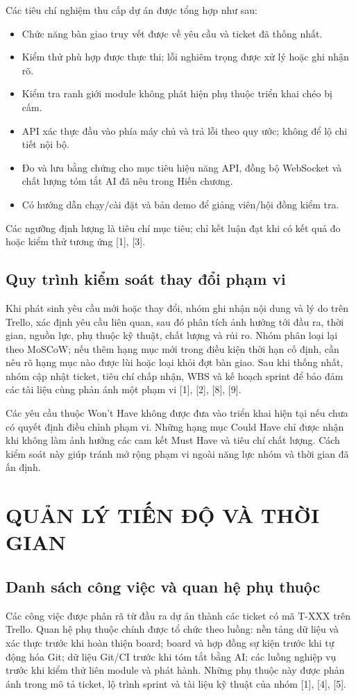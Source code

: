 \documentclass[12pt,a4paper]{report}
\begin{document}
Các tiêu chí nghiệm thu cấp dự án được tổng hợp như sau:
\begin{itemize}
    \item Chức năng bàn giao truy vết được về yêu cầu và ticket đã thống nhất.
    \item Kiểm thử phù hợp được thực thi; lỗi nghiêm trọng được xử lý hoặc ghi nhận rõ.
    \item Kiểm tra ranh giới module không phát hiện phụ thuộc triển khai chéo bị cấm.
    \item API xác thực đầu vào phía máy chủ và trả lỗi theo quy ước; không để lộ chi tiết nội bộ.
    \item Đo và lưu bằng chứng cho mục tiêu hiệu năng API, đồng bộ WebSocket và chất lượng tóm tắt AI đã nêu trong Hiến chương.
    \item Có hướng dẫn chạy/cài đặt và bản demo để giảng viên/hội đồng kiểm tra.
\end{itemize}
Các ngưỡng định lượng là tiêu chí mục tiêu; chỉ kết luận đạt khi có kết quả đo hoặc kiểm thử tương ứng [1], [3].

\section{Quy trình kiểm soát thay đổi phạm vi}
Khi phát sinh yêu cầu mới hoặc thay đổi, nhóm ghi nhận nội dung và lý do trên Trello, xác định yêu cầu liên quan, sau đó phân tích ảnh hưởng tới đầu ra, thời gian, nguồn lực, phụ thuộc kỹ thuật, chất lượng và rủi ro. Nhóm phân loại lại theo MoSCoW; nếu thêm hạng mục mới trong điều kiện thời hạn cố định, cần nêu rõ hạng mục nào được lùi hoặc loại khỏi đợt bàn giao. Sau khi thống nhất, nhóm cập nhật ticket, tiêu chí chấp nhận, WBS và kế hoạch sprint để bảo đảm các tài liệu cùng phản ánh một phạm vi [1], [2], [8], [9].

Các yêu cầu thuộc Won't Have không được đưa vào triển khai hiện tại nếu chưa có quyết định điều chỉnh phạm vi. Những hạng mục Could Have chỉ được nhận khi không làm ảnh hưởng các cam kết Must Have và tiêu chí chất lượng. Cách kiểm soát này giúp tránh mở rộng phạm vi ngoài năng lực nhóm và thời gian đã ấn định.

\chapter{QUẢN LÝ TIẾN ĐỘ VÀ THỜI GIAN}
\section{Danh sách công việc và quan hệ phụ thuộc}
Các công việc được phân rã từ đầu ra dự án thành các ticket có mã T-XXX trên Trello. Quan hệ phụ thuộc chính được tổ chức theo luồng: nền tảng dữ liệu và xác thực trước khi hoàn thiện board; board và hợp đồng sự kiện trước khi tự động hóa Git; dữ liệu Git/CI trước khi tóm tắt bằng AI; các luồng nghiệp vụ trước khi kiểm thử liên module và phát hành. Những phụ thuộc này được phản ánh trong mô tả ticket, lộ trình sprint và tài liệu kỹ thuật của nhóm [1], [4], [5].
\end{document}
